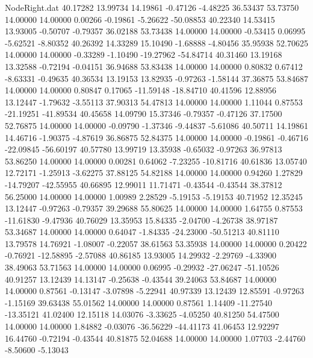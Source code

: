 \begin{filecontents}{NodeRight.dat}
  40.17282   13.99734   14.19861    -0.47126   -4.48225   36.53437   53.73750   14.00000   14.00000    0.00266   -0.19861   -5.26622  -50.08853
  40.22340   14.53415   13.93005    -0.50707   -0.79357   36.02188   53.73438   14.00000   14.00000   -0.53415    0.06995   -5.62521   -8.80352
  40.26392   14.33289   15.10490    -1.68888   -4.80456   35.95938   52.70625   14.00000   14.00000   -0.33289   -1.10490  -19.27962  -54.84714
  40.31460   13.19168   13.32588    -0.72194   -0.04151   36.94688   53.83438   14.00000   14.00000    0.80832    0.67412   -8.63331   -0.49635
  40.36534   13.19153   13.82935    -0.97263   -1.58144   37.36875   53.84687   14.00000   14.00000    0.80847    0.17065  -11.59148  -18.84710
  40.41596   12.88956   13.12447    -1.79632   -3.55113   37.90313   54.47813   14.00000   14.00000    1.11044    0.87553  -21.19251  -41.89534
  40.45658   14.09790   15.37346    -0.79357   -0.47126   37.17500   52.76875   14.00000   14.00000   -0.09790   -1.37346   -9.44837   -5.61086
  40.50711   14.19861   14.46716    -1.90375   -4.87619   36.86875   52.84375   14.00000   14.00000   -0.19861   -0.46716  -22.09845  -56.60197
  40.57780   13.99719   13.35938    -0.65032   -0.97263   36.97813   53.86250   14.00000   14.00000    0.00281    0.64062   -7.23255  -10.81716
  40.61836   13.05740   12.72171    -1.25913   -3.62275   37.88125   54.82188   14.00000   14.00000    0.94260    1.27829  -14.79207  -42.55955
  40.66895   12.99011   11.71471    -0.43544   -0.43544   38.37812   56.25000   14.00000   14.00000    1.00989    2.28529   -5.19153   -5.19153
  40.71952   12.35245   13.12447    -0.97263   -0.79357   39.29688   55.80625   14.00000   14.00000    1.64755    0.87553  -11.61830   -9.47936
  40.76029   13.35953   15.84335    -2.04700   -4.26738   38.97187   53.34687   14.00000   14.00000    0.64047   -1.84335  -24.23000  -50.51213
  40.81110   13.79578   14.76921    -1.08007   -0.22057   38.61563   53.35938   14.00000   14.00000    0.20422   -0.76921  -12.58895   -2.57088
  40.86185   13.93005   14.29932    -2.29769   -4.33900   38.49063   53.71563   14.00000   14.00000    0.06995   -0.29932  -27.06247  -51.10526
  40.91257   13.12439   14.13147    -0.25638   -0.43544   39.24063   53.84687   14.00000   14.00000    0.87561   -0.13147   -3.07898   -5.22941
  40.97339   13.12439   12.85591    -0.97263   -1.15169   39.63438   55.01562   14.00000   14.00000    0.87561    1.14409  -11.27540  -13.35121
  41.02400   12.15118   14.03076    -3.33625   -4.05250   40.81250   54.47500   14.00000   14.00000    1.84882   -0.03076  -36.56229  -44.41173
  41.06453   12.92297   16.44760    -0.72194   -0.43544   40.81875   52.04688   14.00000   14.00000    1.07703   -2.44760   -8.50600   -5.13043

\end{filecontents}
